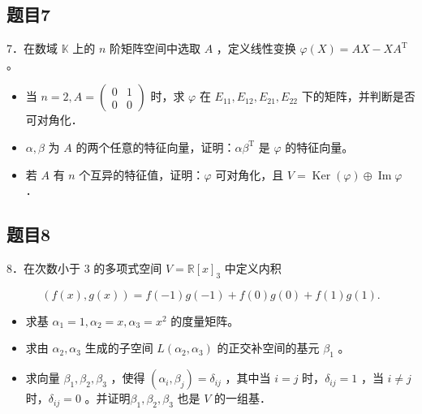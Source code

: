 \documentclass{article}
\begin{document}
\subsection{题目7}
7．在数域 \(\mathbb{K}\) 上的 \(n\) 阶矩阵空间中选取 \(A\) ，定义线性变换 \(\varphi(X)=A X-X A^{\mathrm{T}}\) 。

\begin{itemize}
  \item[（1）] 当 \(n=2, A=\left(\begin{array}{ll}0 & 1 \\ 0 & 0\end{array}\right)\) 时，求 \(\varphi\) 在 \(E_{11}, E_{12}, E_{21}, E_{22}\) 下的矩阵，并判断是否可对角化．
  \item[（2）] \(\alpha, \beta\) 为 \(A\) 的两个任意的特征向量，证明：\(\alpha \beta^{\mathrm{T}}\) 是 \(\varphi\) 的特征向量。
  \item[（3）] 若 \(A\) 有 \(n\) 个互异的特征值，证明：\(\varphi\) 可对角化，且 \(V=\operatorname{Ker}(\varphi) \oplus \operatorname{Im} \varphi\) ．
\end{itemize}

\subsection{题目8}
8．在次数小于 3 的多项式空间 \(V=\mathbb{R}[x]_{3}\) 中定义内积

\[
(f(x), g(x))=f(-1) g(-1)+f(0) g(0)+f(1) g(1) .
\]

\begin{itemize}
  \item[（1）] 求基 \(\alpha_{1}=1, \alpha_{2}=x, \alpha_{3}=x^{2}\) 的度量矩阵。
  \item[（2）] 求由 \(\alpha_{2}, \alpha_{3}\) 生成的子空间 \(L\left(\alpha_{2}, \alpha_{3}\right)\) 的正交补空间的基元 \(\beta_{1}\) 。
  \item[（3）] 求向量 \(\beta_{1}, \beta_{2}, \beta_{3}\) ，使得 \(\left(\alpha_{i}, \beta_{j}\right)=\delta_{i j}\) ，其中当 \(i=j\) 时，\(\delta_{i j}=1\) ，当 \(i \neq j\) 时，\(\delta_{i j}=0\) 。并证明\(\beta_{1}, \beta_{2}, \beta_{3}\) 也是 \(V\) 的一组基．
\end{itemize}
\end{document}
